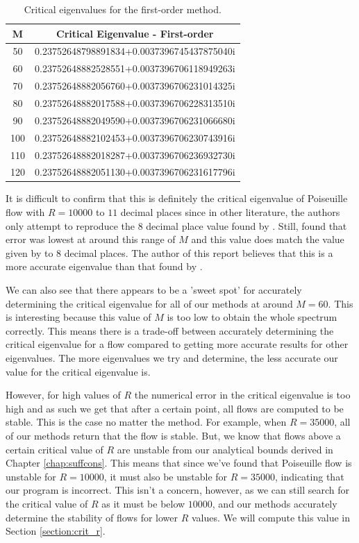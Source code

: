 \begin{table}[h!]
\centering
 \begin{tabular}{c | c} 
 M & Critical Eigenvalue - First-order \\ [0.5ex] 
 \hline
 50  & 0.23752648798891834+0.0037396745437875040i \\
 60  & 0.23752648882528551+0.0037396706118949263i \\
 70  & 0.23752648882056760+0.0037396706231014325i \\
 80  & 0.23752648882017588+0.0037396706228313510i \\
 90  & 0.23752648882049590+0.0037396706231066680i \\  
 100 & 0.23752648882102453+0.0037396706230743916i \\
 110 & 0.23752648882018287+0.0037396706236932730i \\
 120 & 0.23752648882051130+0.0037396706231617796i 
 \end{tabular} 
 \caption{Critical eigenvalues for the first-order method. }
 \label{table:firstorder}
\end{table}

It is difficult to confirm that this is definitely the critical eigenvalue of Poiseuille flow with $ R = 10000 $ to $ 11 $ decimal places since in other literature, the authors only attempt to reproduce the $ 8 $ decimal place value found by \citet{orszag1971accurate}. Still, \citet{bukhari1997spectral} found that error was lowest at around this range of $ M $ and this value does match the value given by \citet{orszag1971accurate} to $8$ decimal places. The author of this report believes that this is a more accurate eigenvalue than that found by \citet{orszag1971accurate}.

We can also see that there appears to be a 'sweet spot' for accurately determining the critical eigenvalue for all of our methods at around $ M = 60$. This is interesting because this value of $ M $ is too low to obtain the whole spectrum correctly. This means there is a trade-off between accurately determining the critical eigenvalue for a flow compared to getting more accurate results for other eigenvalues. The more eigenvalues we try and determine, the less accurate our value for the critical eigenvalue is.

However, for high values of $R$ the numerical error in the critical eigenvalue is too high and as such we get that after a certain point, all flows are computed to be stable. This is the case no matter the method. For example, when $ R = 35000 $, all of our methods return that the flow is stable. But, we know that flows above a certain critical value of $R$ are unstable from our analytical bounds derived in Chapter \ref{chap:suffcons}. This means that since we've found that Poiseuille flow is unstable for $ R = 10000$, it must also be unstable for $ R = 35000 $, indicating that our program is incorrect. This isn't a concern, however, as we can still search for the critical value of $R$ as it must be below $ 10000$, and our methods accurately determine the stability of flows for lower $R$ values. We will compute this value in Section \ref{section:crit_r}.


